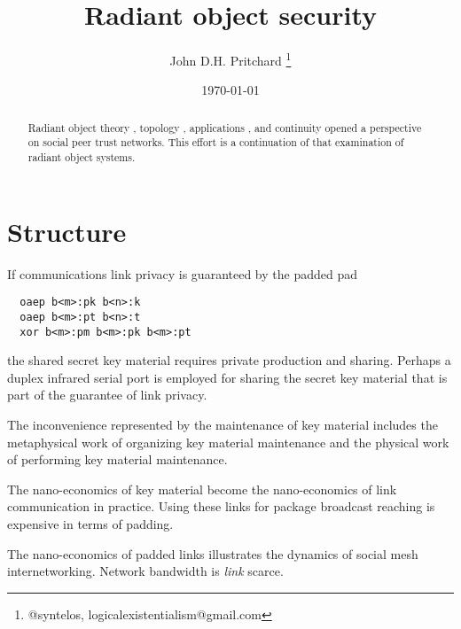 \documentclass[12pt,twocolumn]{article}
\begin{document}
\title{Radiant object security}

\author{John D.H. Pritchard \thanks{@syntelos, logicalexistentialism@gmail.com}}

\date{\today}

\maketitle


\begin{abstract}

Radiant object theory \cite{ROTI}, topology \cite{ROTY}, applications
\cite{ROTA}, and continuity \cite{ROTC} opened a perspective on social
peer trust networks.  This effort is a continuation of that
examination of radiant object systems.
  
\end{abstract}


\section{Structure}

If communications link privacy is guaranteed by the padded pad

\begin{verbatim}
  oaep b<m>:pk b<n>:k
  oaep b<m>:pt b<n>:t
  xor b<m>:pm b<m>:pk b<m>:pt
\end{verbatim}

the shared secret key material requires private production and
sharing.  Perhaps a duplex infrared serial port is employed for
sharing the secret key material that is part of the guarantee of link
privacy.

The inconvenience represented by the maintenance of key material
includes the metaphysical work of organizing key material maintenance
and the physical work of performing key material maintenance.

The nano-economics of key material become the nano-economics of link
communication in practice.  Using these links for package broadcast
reaching is expensive in terms of padding.

The nano-economics of padded links illustrates the dynamics of social
mesh internetworking.  Network bandwidth is {\it link} scarce.

\appendix



\end{document}
